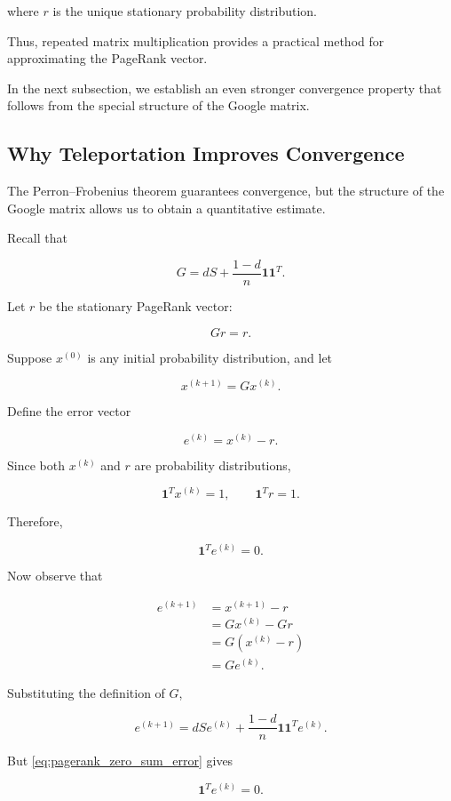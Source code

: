 \documentclass[11pt,a4paper]{article}
\theoremstyle{definition}
\theoremstyle{remark}
\begin{document}
where $r$ is the
unique stationary
probability distribution.

Thus, repeated matrix
multiplication provides
a practical method
for approximating
the PageRank vector.

In the next subsection,
we establish an even
stronger convergence
property that follows
from the special structure
of the Google matrix.


\subsection{Why Teleportation Improves Convergence}

The Perron--Frobenius theorem
guarantees convergence,
but the structure of
the Google matrix
allows us to obtain
a quantitative estimate.

Recall that

\[
G=
dS+
\frac{1-d}{n}
\mathbf{1}\mathbf{1}^T.
\]

Let $r$ be the
stationary PageRank vector:

\[
Gr=r.
\]

Suppose $x^{(0)}$
is any initial
probability distribution,
and let

\[
x^{(k+1)}=Gx^{(k)}.
\]

Define the error vector

\[
e^{(k)}=x^{(k)}-r.
\]

Since both $x^{(k)}$
and $r$ are probability
distributions,

\[
\mathbf{1}^Tx^{(k)}=1,
\qquad
\mathbf{1}^Tr=1.
\]

Therefore,

\begin{equation}
\mathbf{1}^Te^{(k)}=0.
\label{eq:pagerank_zero_sum_error}
\end{equation}

Now observe that

\[
\begin{aligned}
e^{(k+1)}
&=
x^{(k+1)}-r\\
&=
Gx^{(k)}-Gr\\
&=
G(x^{(k)}-r)\\
&=
Ge^{(k)}.
\end{aligned}
\]

Substituting the
definition of $G$,

\[
e^{(k+1)}
=
dSe^{(k)}
+
\frac{1-d}{n}
\mathbf{1}\mathbf{1}^Te^{(k)}.
\]

But
\eqref{eq:pagerank_zero_sum_error}
gives

\[
\mathbf{1}^Te^{(k)}=0.
\]
\end{document}

